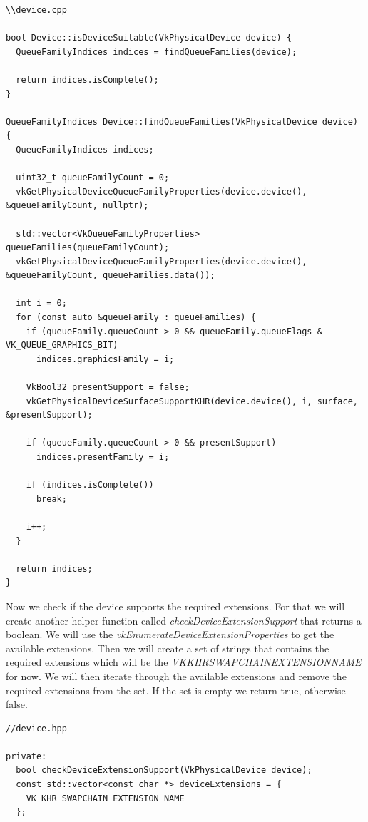 \documentclass[12pt]{report} \usepackage{preamble}
\begin{document}
\begin{lstlisting}[Language=C++]
\\device.cpp

bool Device::isDeviceSuitable(VkPhysicalDevice device) {
  QueueFamilyIndices indices = findQueueFamilies(device);

  return indices.isComplete();
}

QueueFamilyIndices Device::findQueueFamilies(VkPhysicalDevice device) {
  QueueFamilyIndices indices;

  uint32_t queueFamilyCount = 0;
  vkGetPhysicalDeviceQueueFamilyProperties(device.device(), &queueFamilyCount, nullptr);

  std::vector<VkQueueFamilyProperties> queueFamilies(queueFamilyCount);
  vkGetPhysicalDeviceQueueFamilyProperties(device.device(), &queueFamilyCount, queueFamilies.data());

  int i = 0;
  for (const auto &queueFamily : queueFamilies) {
    if (queueFamily.queueCount > 0 && queueFamily.queueFlags & VK_QUEUE_GRAPHICS_BIT)
      indices.graphicsFamily = i;

    VkBool32 presentSupport = false;
    vkGetPhysicalDeviceSurfaceSupportKHR(device.device(), i, surface, &presentSupport);

    if (queueFamily.queueCount > 0 && presentSupport)
      indices.presentFamily = i;

    if (indices.isComplete())
      break;

    i++;
  }

  return indices;
}
\end{lstlisting}

Now we check if the device supports the required extensions. For that we will create another helper function
called \textit{checkDeviceExtensionSupport} that returns a boolean. We will use the \textit{vkEnumerateDeviceExtensionProperties}
to get the available extensions. Then we will create a set of strings that contains the required extensions which will be the
\textit{VK\textunderscore KHR\textunderscore SWAPCHAIN\textunderscore EXTENSION\textunderscore NAME} for now. We will then iterate through
the available extensions and remove the required extensions from the set. If the set is empty we return true, otherwise false.

\begin{lstlisting}[Language=C++]
//device.hpp

private:
  bool checkDeviceExtensionSupport(VkPhysicalDevice device);
  const std::vector<const char *> deviceExtensions = {
    VK_KHR_SWAPCHAIN_EXTENSION_NAME
  };
\end{lstlisting}
\end{document}
